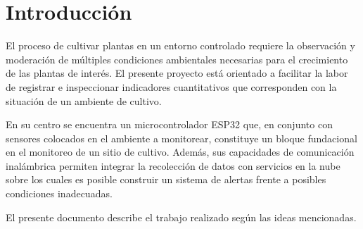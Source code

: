 \documentclass[../main]{subfiles}
\begin{document}
\section{Introducción}

El proceso de cultivar plantas en un entorno controlado requiere la observación
y moderación de múltiples condiciones ambientales necesarias para el crecimiento
de las plantas de interés.
El presente proyecto está orientado a facilitar la labor de registrar e
inspeccionar indicadores cuantitativos que corresponden con la situación de un
ambiente de cultivo.

En su centro se encuentra un microcontrolador ESP32 \supercite{devkitv4} que, en
conjunto con sensores colocados en el ambiente a monitorear, constituye un
bloque fundacional en el monitoreo de un sitio de cultivo.
Además, sus capacidades de comunicación inalámbrica permiten integrar la
recolección de datos con servicios en la nube sobre los cuales es posible
construir un sistema de alertas frente a posibles condiciones inadecuadas.

El presente documento describe el trabajo realizado según las ideas mencionadas.
\end{document}
